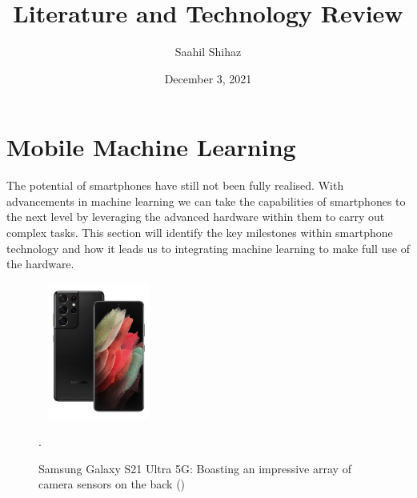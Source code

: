 \documentclass{article}
\title{Literature and Technology Review}
\author{Saahil Shihaz}
\date{December 3, 2021}
\begin{document}
\maketitle
\tableofcontents
\newpage
\section{Mobile Machine Learning}
The potential of smartphones have still not been fully realised. With advancements in machine learning we can take the 
capabilities of smartphones to the next level by leveraging the advanced hardware within them to carry out complex 
tasks. This section will identify the key milestones within smartphone technology and how it leads us to integrating 
machine learning to make full use of the hardware.
\begin{figure}[h]\
    \centering
    \includegraphics[width=0.3\textwidth]{s21ultra.jpg}
    \caption{Samsung Galaxy S21 Ultra 5G: Boasting an impressive array of camera sensors on the back (\cite{three2021})}.
\end{figure}
\end{document}
